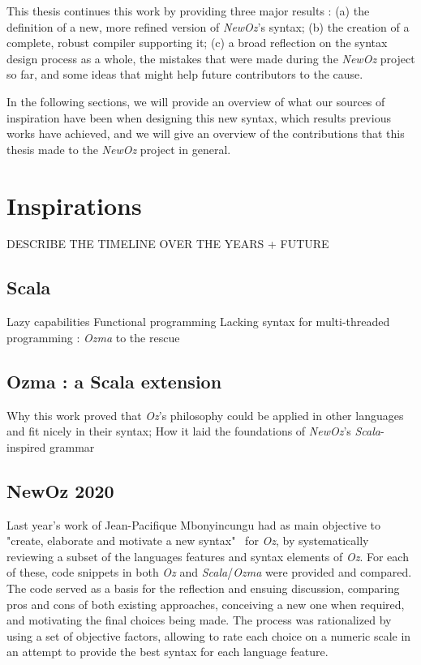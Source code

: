 This thesis continues this work by providing three major results :
(a) the definition of a new, more refined version of \textit{NewOz}'s syntax;
(b) the creation of a complete, robust compiler supporting it;
(c) a broad reflection on the syntax design process as a whole, the mistakes that were made during the \textit{NewOz} project so far, and some ideas that might help future contributors to the cause.\newline

In the following sections, we will provide an overview of what our sources of inspiration have been when designing this new syntax, which results previous works have achieved, and we will give an overview of the contributions that this thesis made to the \textit{NewOz} project in general.

\section{Inspirations}\label{sec:ch1-inspirations}

DESCRIBE THE TIMELINE OVER THE YEARS + FUTURE

\subsection{Scala}\label{subsec:ch1-scala}
Lazy capabilities\newline
Functional programming\newline
\newline
Lacking syntax for multi-threaded programming : \textit{Ozma} to the rescue

\subsection{Ozma : a Scala extension}\label{subsec:ch1-ozma}
Why this work proved that \textit{Oz}'s philosophy could be applied in other languages and fit nicely in their syntax;
How it laid the foundations of \textit{NewOz}'s \textit{Scala}-inspired grammar

\subsection{NewOz 2020}\label{subsec:ch1-newoz2020}
Last year's work of Jean-Pacifique Mbonyincungu had as main objective to "create, elaborate and motivate a new syntax"~\cite{jpthesis} for \textit{Oz}, by systematically reviewing a subset of the languages features and syntax elements of \textit{Oz}.
For each of these, code snippets in both \textit{Oz} and \textit{Scala}/\textit{Ozma} were provided and compared.
The code served as a basis for the reflection and ensuing discussion, comparing pros and cons of both existing approaches, conceiving a new one when required, and motivating the final choices being made.
The process was rationalized by using a set of objective factors, allowing to rate each choice on a numeric scale in an attempt to provide the best syntax for each language feature.\newline

